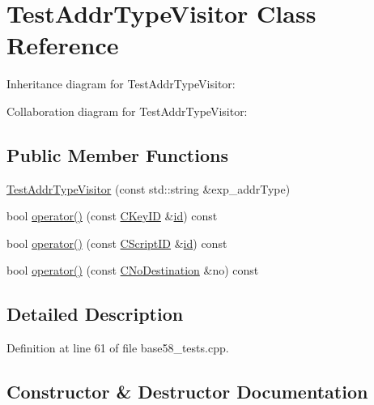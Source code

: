 \hypertarget{class_test_addr_type_visitor}{}\section{Test\+Addr\+Type\+Visitor Class Reference}
\label{class_test_addr_type_visitor}


Inheritance diagram for Test\+Addr\+Type\+Visitor\+:


Collaboration diagram for Test\+Addr\+Type\+Visitor\+:
\subsection*{Public Member Functions}
\begin{DoxyCompactItemize}
\item 
\hyperlink{class_test_addr_type_visitor_ae60ae920ab6c864c5543a9a795fde74a}{Test\+Addr\+Type\+Visitor} (const std\+::string \&exp\+\_\+addr\+Type)
\item 
bool \hyperlink{class_test_addr_type_visitor_a48efd26888a968e1b35843950a7c639f}{operator()} (const \hyperlink{class_c_key_i_d}{C\+Key\+I\+D} \&\hyperlink{db__test_8cc_a7441ef0865bcb3db9b8064dd7375c1ea}{id}) const 
\item 
bool \hyperlink{class_test_addr_type_visitor_a5168376a62c013762f6777076c456822}{operator()} (const \hyperlink{class_c_script_i_d}{C\+Script\+I\+D} \&\hyperlink{db__test_8cc_a7441ef0865bcb3db9b8064dd7375c1ea}{id}) const 
\item 
bool \hyperlink{class_test_addr_type_visitor_ad612b65af5ab7f6aead511daf97196a6}{operator()} (const \hyperlink{class_c_no_destination}{C\+No\+Destination} \&no) const 
\end{DoxyCompactItemize}


\subsection{Detailed Description}


Definition at line 61 of file base58\+\_\+tests.\+cpp.



\subsection{Constructor \& Destructor Documentation}
\hypertarget{class_test_addr_type_visitor_ae60ae920ab6c864c5543a9a795fde74a}{}
